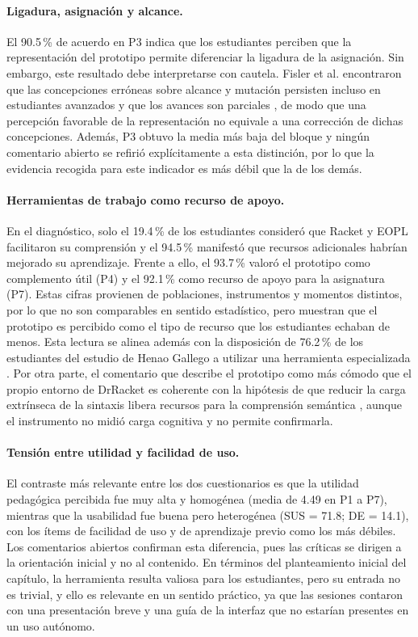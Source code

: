 \paragraph{Ligadura, asignación y alcance.} El 90.5\,\% de acuerdo en P3 indica que los estudiantes perciben que la representación del prototipo permite diferenciar la ligadura de la asignación. Sin embargo, este resultado debe interpretarse con cautela. Fisler et al. encontraron que las concepciones erróneas sobre alcance y mutación persisten incluso en estudiantes avanzados y que los avances son parciales \cite{fisler2017scope}, de modo que una percepción favorable de la representación no equivale a una corrección de dichas concepciones. Además, P3 obtuvo la media más baja del bloque y ningún comentario abierto se refirió explícitamente a esta distinción, por lo que la evidencia recogida para este indicador es más débil que la de los demás.

\paragraph{Herramientas de trabajo como recurso de apoyo.} En el diagnóstico, solo el 19.4\,\% de los estudiantes consideró que Racket y EOPL facilitaron su comprensión y el 94.5\,\% manifestó que recursos adicionales habrían mejorado su aprendizaje. Frente a ello, el 93.7\,\% valoró el prototipo como complemento útil (P4) y el 92.1\,\% como recurso de apoyo para la asignatura (P7). Estas cifras provienen de poblaciones, instrumentos y momentos distintos, por lo que no son comparables en sentido estadístico, pero muestran que el prototipo es percibido como el tipo de recurso que los estudiantes echaban de menos. Esta lectura se alinea además con la disposición de 76.2\,\% de los estudiantes del estudio de Henao Gallego a utilizar una herramienta especializada \cite{henao2026recomendacion}. Por otra parte, el comentario que describe el prototipo como más cómodo que el propio entorno de DrRacket es coherente con la hipótesis de que reducir la carga extrínseca de la sintaxis libera recursos para la comprensión semántica \cite{sweller2024cognitive, gordon2024linguistics}, aunque el instrumento no midió carga cognitiva y no permite confirmarla.

\paragraph{Tensión entre utilidad y facilidad de uso.} El contraste más relevante entre los dos cuestionarios es que la utilidad pedagógica percibida fue muy alta y homogénea (media de 4.49 en P1 a P7), mientras que la usabilidad fue buena pero heterogénea (SUS = 71.8; DE = 14.1), con los ítems de facilidad de uso y de aprendizaje previo como los más débiles. Los comentarios abiertos confirman esta diferencia, pues las críticas se dirigen a la orientación inicial y no al contenido. En términos del planteamiento inicial del capítulo, la herramienta resulta valiosa para los estudiantes, pero su entrada no es trivial, y ello es relevante en un sentido práctico, ya que las sesiones contaron con una presentación breve y una guía de la interfaz que no estarían presentes en un uso autónomo.

